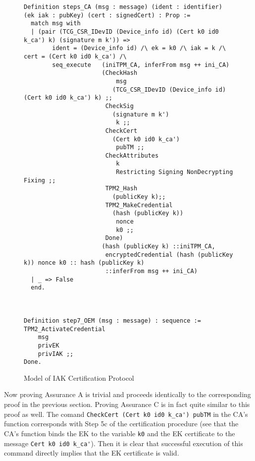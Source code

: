 \begin{figure}[h!]
\begin{lstlisting}[language=Coq]
Definition steps_CA (msg : message) (ident : identifier) (ek iak : pubKey) (cert : signedCert) : Prop :=
  match msg with
  | (pair (TCG_CSR_IDevID (Device_info id) (Cert k0 id0 k_ca') k) (signature m k')) =>
        ident = (Device_info id) /\ ek = k0 /\ iak = k /\ cert = (Cert k0 id0 k_ca') /\
        seq_execute   (iniTPM_CA, inferFrom msg ++ ini_CA)
                      (CheckHash 
                          msg 
                         (TCG_CSR_IDevID (Device_info id) (Cert k0 id0 k_ca') k) ;;
                       CheckSig 
                         (signature m k') 
                          k ;;
                       CheckCert 
                         (Cert k0 id0 k_ca') 
                          pubTM ;;
                       CheckAttributes 
                          k 
                          Restricting Signing NonDecrypting Fixing ;;
                       TPM2_Hash 
                         (publicKey k);;
                       TPM2_MakeCredential 
                         (hash (publicKey k))
                          nonce
                          k0 ;;
                       Done)
                      (hash (publicKey k) ::iniTPM_CA, 
                       encryptedCredential (hash (publicKey k)) nonce k0 :: hash (publicKey k) 
                       ::inferFrom msg ++ ini_CA)
  | _ => False
  end.



Definition step7_OEM (msg : message) : sequence :=
TPM2_ActivateCredential 
    msg 
    privEK 
    privIAK ;;
Done.
\end{lstlisting}
\caption{Model of IAK Certification Protocol}
\label{fig:iak_model}
\end{figure}

Now proving Assurance A is trivial and proceeds identically to the corresponding proof in the previous section.
Proving Assurance C is in fact quite similar to this proof as well. The comand \verb|CheckCert (Cert k0 id0 k_ca') pubTM| in the CA's function corresponds with Step 5c of the certification procedure (see that the CA's function binds the EK to the variable \verb|k0| and the EK certificate to the message \verb|Cert k0 id0 k_ca'|). Then it is clear that successful execution of this command directly implies that the EK certificate is valid.

